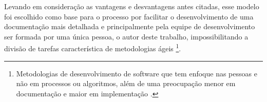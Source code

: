 Levando em consideração as vantagens e desvantagens antes citadas, esse modelo foi escolhido como base para o processo por facilitar o desenvolvimento de uma documentação mais detalhada e 
principalmente pela equipe de desenvolvimento ser formada por uma única pessoa, o autor deste trabalho, impossibilitando a divisão de tarefas característica de metodologias 
ágeis \footnote{Metodologias de desenvolvimento de software que tem enfoque nas pessoas e não em processos ou algoritmos, além de uma preocupação menor em documentação e maior em implementação 
\cite{michel2004metodologias}.}.

\begin{figure}[h!]
    \centering
\end{figure}


